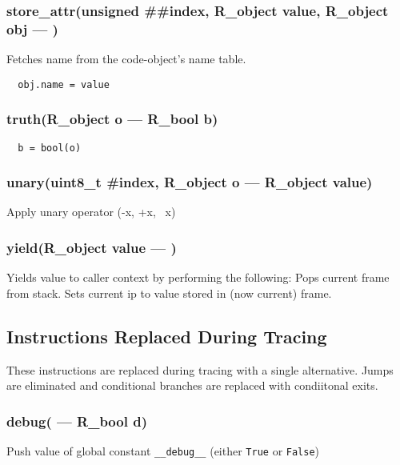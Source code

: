 \subsubsection{store\_attr(unsigned \#\#index, R\_object value, R\_object obj --- )}
\vspace{-1em}Fetches name from the code-object's name table. \vspace{-1em}\begin{verbatim}
  obj.name = value
\end{verbatim}
\vspace{-1em}\vspace{-1em}
\subsubsection{truth(R\_object o  --- R\_bool b)}
\vspace{-1em}\begin{verbatim}
  b = bool(o)
\end{verbatim}
\vspace{-1em}\vspace{-1em}
\subsubsection{unary(uint8\_t \#index, R\_object o --- R\_object value)}
\vspace{-1em}Apply unary operator (-x, +x, ~x) \vspace{-1em}
\subsubsection{yield(R\_object value --- )}
\vspace{-1em}Yields value to caller context by performing the following: Pops current frame from stack. Sets current ip to value stored in (now current) frame. \vspace{-1em}
\subsection{Instructions Replaced During Tracing}

        These instructions are replaced during tracing with a single alternative.
        Jumps are eliminated and conditional branches are replaced with 
        condiitonal exits. 
    
\subsubsection{debug( --- R\_bool d)}
\vspace{-1em}Push value of global constant \texttt{\_\_debug\_\_} (either \texttt{True} or \texttt{False}) \vspace{-1em}
